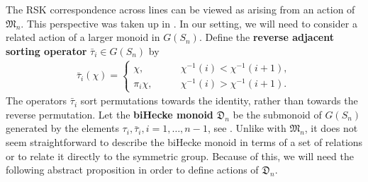 \documentclass[11pt]{article}
\theoremstyle{definition} %
\theoremstyle{remark} %
\begin{document}
The RSK correspondence across lines can be viewed as arising from an action of $\mathfrak{M}_n$. This perspective was taken up in \cite{biane2005littelmann}. In our setting, we will need to consider a related action of a larger monoid in $G(S_n)$. 
Define the \textbf{reverse adjacent sorting operator} $\bar \tau_i \in G(S_n)$ by
\begin{align*}
\bar \tau_i(\chi) = \begin{cases}
\chi, \qquad &\chi^{-1}(i) < \chi^{-1}(i+1), \\
\pi_i \chi, \qquad &\chi^{-1}(i) > \chi^{-1}(i+1).
\end{cases}
\end{align*}
The operators $\bar \tau_i$ sort permutations towards the identity, rather than towards the reverse permutation. Let the \textbf{biHecke monoid} $\mathfrak{D}_n$ be the submonoid of $G(S_n)$ generated by the elements $\tau_i, \bar \tau_i, i = 1, \dots, n-1$, see \cite{HST13}. Unlike with $\mathfrak{M}_n$, it does not seem straightforward to describe the biHecke monoid in terms of a set of relations or to relate it directly to the symmetric group. Because of this, we will need the following abstract proposition in order to define actions of $\mathfrak{D}_n$.
\end{document}
